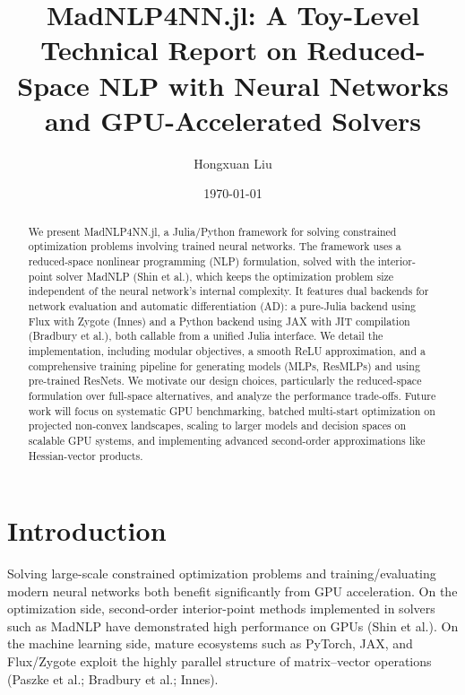 \documentclass[11pt]{article}
\title{MadNLP4NN.jl: A Toy-Level Technical Report on Reduced-Space NLP with Neural Networks and GPU-Accelerated Solvers}
\author{Hongxuan Liu}
\date{\today}
\begin{document}
\maketitle

\begin{abstract}
We present MadNLP4NN.jl, a Julia/Python framework for solving constrained optimization problems involving trained neural networks. The framework uses a reduced-space nonlinear programming (NLP) formulation, solved with the interior-point solver MadNLP (Shin et al.), which keeps the optimization problem size independent of the neural network's internal complexity. It features dual backends for network evaluation and automatic differentiation (AD): a pure-Julia backend using Flux with Zygote (Innes) and a Python backend using JAX with JIT compilation (Bradbury et al.), both callable from a unified Julia interface. We detail the implementation, including modular objectives, a smooth ReLU approximation, and a comprehensive training pipeline for generating models (MLPs, ResMLPs) and using pre-trained ResNets. We motivate our design choices, particularly the reduced-space formulation over full-space alternatives, and analyze the performance trade-offs. Future work will focus on systematic GPU benchmarking, batched multi-start optimization on projected non-convex landscapes, scaling to larger models and decision spaces on scalable GPU systems, and implementing advanced second-order approximations like Hessian-vector products.
\end{abstract}

\section{Introduction}
Solving large-scale constrained optimization problems and training/evaluating modern neural networks both benefit significantly from GPU acceleration. On the optimization side, second-order interior-point methods implemented in solvers such as MadNLP have demonstrated high performance on GPUs (Shin et al.). On the machine learning side, mature ecosystems such as PyTorch, JAX, and Flux/Zygote exploit the highly parallel structure of matrix–vector operations (Paszke et al.; Bradbury et al.; Innes).
\end{document}
